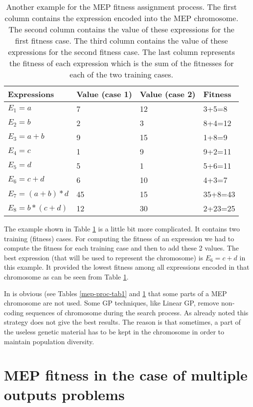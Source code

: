 \documentclass [11pt]{article}
\begin{document}
\begin{table}
\caption{Another example for the MEP fitness assignment process. The first column contains the expression encoded into the MEP chromosome. The second column contains the value of these expressions for the first fitness case. The third column contains the value of these expressions for the second fitness case. The last column represents the fitness of each expression which is the sum of the fitnesses for each of the two training cases.}
\label{mep-proc-tab2}
\begin{center}
\begin{tabular}
{p{70pt}p{70pt}p{70pt}p{70pt}}
\hline
Expressions& 
Value (case 1)&
Value (case 2)&
Fitness \\
\hline
$E_1 = a$&
7&
12&
3+5=8\\
$E_2 = b$&
2&
3&
8+4=12\\
$E_3 = a+b$&
9&
15&
1+8=9\\
$E_4 = c$&
1&
9&
9+2=11\\
$E_5 = d$&
5&
1&
5+6=11\\
$E_6 = c+d$&
6&
10&
4+3=7\\
$E_7 = (a+b)*d$&
45&
15&
35+8=43\\
$E_8 = b*(c+d)$&
12&
30&
2+23=25\\
\hline
\end{tabular}
\end{center}
\end{table}

The example shown in Table \ref{mep-proc-tab2} is a little bit more complicated. It contains two training (fitness) cases. For computing the fitness of an expression we had to compute the fitness for each training case and then to add these 2 values. The best expression (that will be used to represent the chromosome) is $E_6 = c+d$ in this example. It provided the lowest fitness among all expressions encoded in that chromosome as can be seen from Table \ref{mep-proc-tab2}.

In is obvious (see Tables \ref{mep-proc-tab1} and \ref{mep-proc-tab2} that some parts of a MEP chromosome are not used. Some GP techniques, like Linear GP, remove non-coding sequences of chromosome during the search process. As already noted \cite{brameier1} this strategy does not give the best results. The reason is that sometimes, a part of the 
useless genetic material has to be kept in the chromosome in order to 
maintain population diversity.\\

\section{MEP fitness in the case of multiple outputs problems}
\label{mep_fit_multiple_outputs}
\end{document}
